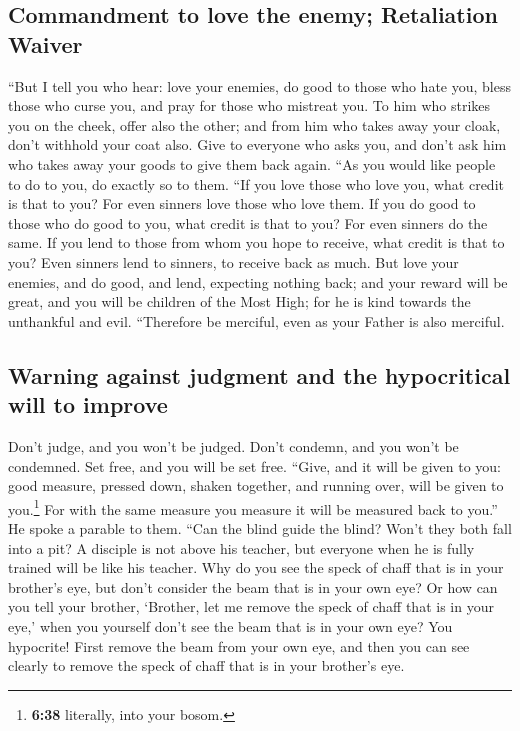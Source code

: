 \hypertarget{commandment-to-love-the-enemy-retaliation-waiver}{%
\subsection{Commandment to love the enemy; Retaliation
Waiver}\label{commandment-to-love-the-enemy-retaliation-waiver}}

 ``But I tell you who hear: love your enemies, do good to
those who hate you,  bless those who curse you, and pray
for those who mistreat you.  To him who strikes you on
the cheek, offer also the other; and from him who takes away your cloak,
don't withhold your coat also.  Give to everyone who asks
you, and don't ask him who takes away your goods to give them back
again.  ``As you would like people to do to you, do
exactly so to them.  ``If you love those who love you,
what credit is that to you? For even sinners love those who love them.
 If you do good to those who do good to you, what credit
is that to you? For even sinners do the same.  If you
lend to those from whom you hope to receive, what credit is that to you?
Even sinners lend to sinners, to receive back as much. 
But love your enemies, and do good, and lend, expecting nothing back;
and your reward will be great, and you will be children of the Most
High; for he is kind towards the unthankful and evil. 
``Therefore be merciful, even as your Father is also merciful.

\hypertarget{warning-against-judgment-and-the-hypocritical-will-to-improve}{%
\subsection{Warning against judgment and the hypocritical will to
improve}\label{warning-against-judgment-and-the-hypocritical-will-to-improve}}

 Don't judge, and you won't be judged. Don't condemn, and
you won't be condemned. Set free, and you will be set free.
 ``Give, and it will be given to you: good measure,
pressed down, shaken together, and running over, will be given to
you.\footnote{\textbf{6:38} literally, into your bosom.} For with the
same measure you measure it will be measured back to you.''
 He spoke a parable to them. ``Can the blind guide the
blind? Won't they both fall into a pit?  A disciple is
not above his teacher, but everyone when he is fully trained will be
like his teacher.  Why do you see the speck of chaff that
is in your brother's eye, but don't consider the beam that is in your
own eye?  Or how can you tell your brother, `Brother, let
me remove the speck of chaff that is in your eye,' when you yourself
don't see the beam that is in your own eye? You hypocrite! First remove
the beam from your own eye, and then you can see clearly to remove the
speck of chaff that is in your brother's eye.

